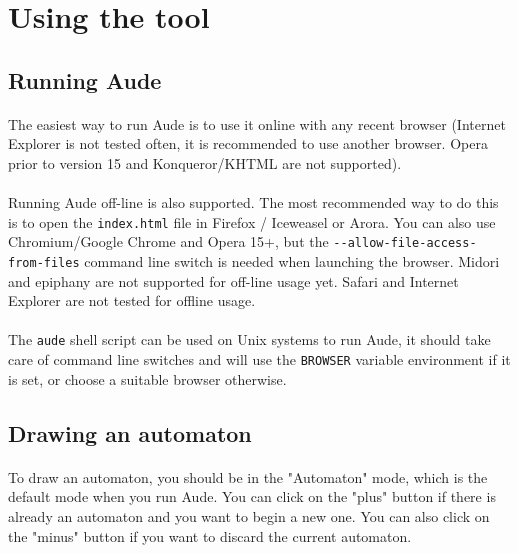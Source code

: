 \section{Using the tool}

\subsection{Running Aude}
\paragraph{}
The easiest way to run Aude is to use it online with any recent browser (Internet Explorer is not tested often, it is recommended to use another browser. Opera prior to version 15 and Konqueror/KHTML are not supported).

\paragraph{}
Running Aude off-line is also supported. The most recommended way to do this is to open the \verb!index.html! file in Firefox / Iceweasel or Arora. You can also use Chromium/Google Chrome and Opera 15+, but the \verb!--allow-file-access-from-files! command line switch is needed when launching the browser. Midori and epiphany are not supported for off-line usage yet. Safari and Internet Explorer are not tested for offline usage.

\paragraph{}
The \verb!aude! shell script can be used on Unix systems to run Aude, it should take care of command line switches and will use the \verb!BROWSER! variable environment if it is set, or choose a suitable browser otherwise.

\subsection{Drawing an automaton}

\paragraph{}
To draw an automaton, you should be in the "Automaton" mode, which is the default mode when you run Aude. You can click on the "plus" button if there is already an automaton and you want to begin a new one. You can also click on the "minus" button if you want to discard the current automaton.

